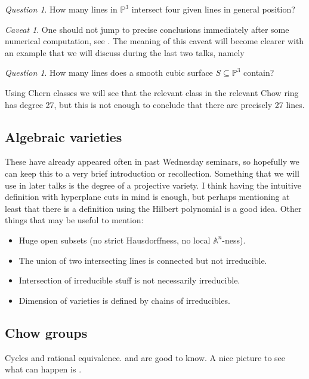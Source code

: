 \documentclass[A4paper, 12pt, british, reqno]{amsart}
\newcommand{\A}{\mathbb{A}} %
\renewcommand{\P}{\mathbb{P}} %
\theoremstyle{plain}
\theoremstyle{definition}
\theoremstyle{remark}
\newtheorem{q}[thm]{Question}
\newtheorem{caveat}[thm]{Caveat}
\theoremstyle{plain}
\theoremstyle{definition}
\theoremstyle{remark}
\theoremstyle{plain}
\theoremstyle{definition}
\theoremstyle{remark}
\begin{document}
\begin{q}
    How many lines in $\P^{3}$ intersect four given lines in general position?
\end{q}

\begin{caveat}\label{caveat1}
    One should not jump to precise conclusions immediately after some numerical computation, see \cite[\S 3.1.2]{eh16}.
    The meaning of this caveat will become clearer with an example that we will discuss during the last two talks, namely
\end{caveat}

\begin{q}
    How many lines does a smooth cubic surface $S\subseteq \P^{3}$ contain?
\end{q}

Using Chern classes we will see that the relevant class in the relevant Chow ring has degree 27, but this is not enough to conclude that there are precisely 27 lines.

\subsection{Algebraic varieties}

These have already appeared often in past Wednesday seminars, so hopefully we can keep this to a very brief introduction or recollection.
Something that we will use in later talks is the degree of a projective variety.
I think having the intuitive definition with hyperplane cuts in mind is enough, but perhaps mentioning at least that there is a definition using the Hilbert polynomial is a good idea.
Other things that may be useful to mention:
\begin{itemize}
    \item Huge open subsets (no strict Hausdorffness, no local $\A^{n}$-ness).
    \item The union of two intersecting lines is connected but not irreducible.
    \item Intersection of irreducible stuff is not necessarily irreducible.
    \item Dimension of varieties is defined by chains of irreducibles.
\end{itemize}

\subsection{Chow groups \cite[\S 1.2.1 and 1.2.2]{eh16}}
Cycles and rational equivalence.
\cite[Prop.~1.4]{eh16} and \cite[Prop.~1.10]{eh16} are good to know.
A nice picture to see what can happen is \cite[Fig.~1.2]{eh16}.
\end{document}
